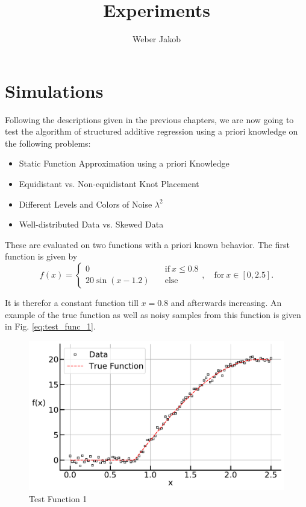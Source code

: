 \documentclass[10pt,a4paper]{article}
\title{Experiments}
\author{Weber Jakob}
\begin{document}
	\maketitle
	
\section{Simulations}

Following the descriptions given in the previous chapters, we are now going to test the algorithm of structured additive regression using a priori knowledge on the following problems:	

\begin{itemize}
	\item Static Function Approximation using a priori Knowledge
	\item Equidistant vs. Non-equidistant Knot Placement
	\item Different Levels and Colors of Noise $\lambda^2$
	\item Well-distributed Data vs. Skewed Data
\end{itemize}

These are evaluated on two functions with a priori known behavior. The first function is given by
\begin{equation} \label{eq:test_func_1}
	f(x) = \begin{cases}
			 0 \quad &\text{if} \ x \le 0.8 \\ 
			 20\sin (x-1.2) \quad &\text{else}  
		  \end{cases}, \quad \text{for} \ x \in [0, 2.5].
\end{equation}
	
It is therefor a constant function till $x=0.8$ and afterwards increasing. An example of the true function as well as noisy samples from this function is given in Fig. \ref{eq:test_func_1}.

\begin{figure}[H]
	\centering
	\includegraphics[width=\columnwidth]{../thesisplots/exp_inc1_data.pdf}
	\caption{Test Function 1}
	\label{fig:test_func_1}
\end{figure}
\end{document}
